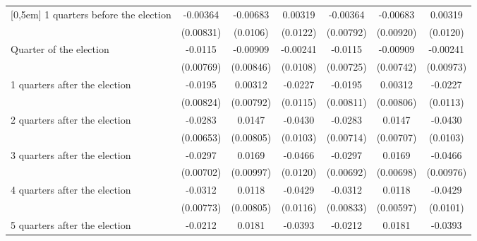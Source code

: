 \begin{table}[!ht]
\begin{tabular}{l*{6}{c}}
[0,5em]
 1 quarters before the election&    -0.00364         &    -0.00683         &     0.00319         &    -0.00364         &    -0.00683         &     0.00319         \\
                    &   (0.00831)         &    (0.0106)         &    (0.0122)         &   (0.00792)         &   (0.00920)         &    (0.0120)         \\
[0,5em]
Quarter of the election&     -0.0115         &    -0.00909         &    -0.00241         &     -0.0115         &    -0.00909         &    -0.00241         \\
                    &   (0.00769)         &   (0.00846)         &    (0.0108)         &   (0.00725)         &   (0.00742)         &   (0.00973)         \\
[0,5em]
 1 quarters after the election&     -0.0195\sym{*}  &     0.00312         &     -0.0227\sym{*}  &     -0.0195\sym{*}  &     0.00312         &     -0.0227\sym{*}  \\
                    &   (0.00824)         &   (0.00792)         &    (0.0115)         &   (0.00811)         &   (0.00806)         &    (0.0113)         \\
[0,5em]
 2 quarters after the election&     -0.0283\sym{***}&      0.0147         &     -0.0430\sym{***}&     -0.0283\sym{***}&      0.0147\sym{*}  &     -0.0430\sym{***}\\
                    &   (0.00653)         &   (0.00805)         &    (0.0103)         &   (0.00714)         &   (0.00707)         &    (0.0103)         \\
[0,5em]
 3 quarters after the election&     -0.0297\sym{***}&      0.0169         &     -0.0466\sym{***}&     -0.0297\sym{***}&      0.0169\sym{*}  &     -0.0466\sym{***}\\
                    &   (0.00702)         &   (0.00997)         &    (0.0120)         &   (0.00692)         &   (0.00698)         &   (0.00976)         \\
[0,5em]
 4 quarters after the election&     -0.0312\sym{***}&      0.0118         &     -0.0429\sym{***}&     -0.0312\sym{***}&      0.0118\sym{*}  &     -0.0429\sym{***}\\
                    &   (0.00773)         &   (0.00805)         &    (0.0116)         &   (0.00833)         &   (0.00597)         &    (0.0101)         \\
[0,5em]
 5 quarters after the election&     -0.0212\sym{**} &      0.0181         &     -0.0393\sym{***}&     -0.0212\sym{**} &      0.0181         &     -0.0393\sym{**} \\

\end{tabular}
\end{table}
